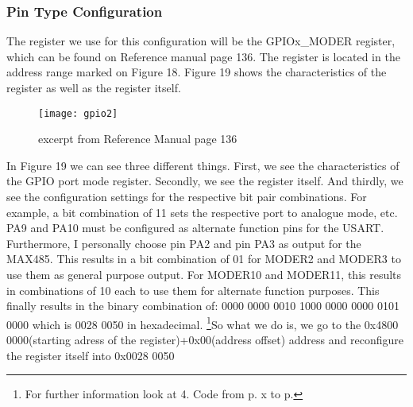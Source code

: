 \documentclass[11pt]{scrartcl}
\begin{document}
\newpage
	\subsubsection{Pin Type Configuration}
The register we use for this configuration will be the GPIOx\_MODER register, which can be found on Reference manual page 136. The register is located in the address range marked on Figure 18. Figure 19 shows the characteristics of the register as well as the register itself.
\begin{figure}[h]
		\centering
		\texttt{[image: gpio2]}
		\caption{excerpt from Reference Manual page 136}
\end{figure}
In Figure 19 we can see three different things. First, we see the characteristics of the GPIO port mode register. Secondly, we see the register itself. And thirdly, we see the configuration settings for the respective bit pair combinations. For example, a bit combination of 11 sets the respective port to analogue mode, etc. PA9 and PA10 must be configured as alternate function pins for the USART. Furthermore, I personally choose pin PA2 and pin PA3 as output for the MAX485.
\newline\newline
This results in a bit combination of 01 for MODER2 and MODER3 to use them as general purpose output. For MODER10 and MODER11, this results in combinations of 10 each to use them for alternate function purposes. 
\newline\newline
This finally results in the binary combination of: 0000 0000 0010 1000 0000 0000 0101 0000 which is 0028 0050 in hexadecimal.
\newline\newline
\footnote{\label{foot:18}For further information look at 4. Code from p. x to p.}So what we do is, we go to the 0x4800 0000(starting adress of the register)+0x00(address offset) address and reconfigure the register itself into 0x0028 0050



\newpage
\end{document}

